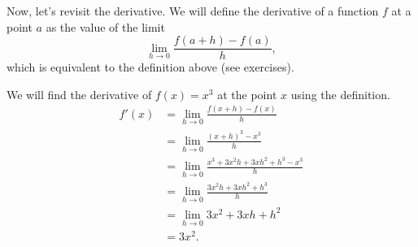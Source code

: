 Now, let's revisit the derivative. We will define the derivative of a function $ f $ at a point $ a $ as
the value of the limit
\begin{displaymath}
  \lim_{h \to 0} \frac{f(a + h) - f(a)}{h},
\end{displaymath}
which is equivalent to the definition above (see exercises).

\begin{ex}
  We will find the derivative of $ f(x) = x^3 $ at the point $ x $ using the definition.
  \begin{align*}
    f'(x) &= \lim_{h \to 0} \frac{f(x + h) - f(x)}{h}\\
          &= \lim_{h \to 0} \frac{(x + h)^3 - x^3}{h}\\
          &= \lim_{h \to 0} \frac{x^3 + 3x^2h + 3xh^2 + h^3 - x^3}{h}\\
          &= \lim_{h \to 0} \frac{3x^2 h + 3xh^2 + h^3}{h}\\
          &= \lim_{h \to 0} 3x^2 + 3xh + h^2\\
          &= 3x^2.
  \end{align*}
\end{ex}


